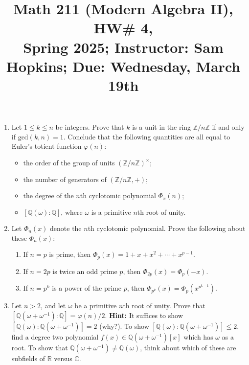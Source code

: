 \documentclass[11pt]{article}
\title{Math 211 (Modern Algebra II), HW\# 4, \\ {\normalsize Spring 2025; Instructor: Sam Hopkins; Due: Wednesday, March 19th}}
\date{}
\begin{document}
\maketitle

\thispagestyle{empty}

\begin{enumerate}

\item Let $1 \leq k \leq n$ be integers. Prove that $k$ is a unit in the ring $\mathbb{Z}/n\mathbb{Z}$ if and only if $\mathrm{gcd}(k,n)=1$. Conclude that the following quantities are all equal to Euler's totient function $\varphi(n)$:
\begin{itemize}
\item the order of the group of units $(\mathbb{Z}/n\mathbb{Z})^{\times}$;
\item the number of generators of $(\mathbb{Z}/n\mathbb{Z},+)$;
\item the degree of the $n$th cyclotomic polynomial $\Phi_x(n)$;
\item $[\mathbb{Q}(\omega)\colon\mathbb{Q}]$, where $\omega$ is a primitive $n$th root of unity.
\end{itemize}

\item Let $\Phi_n(x)$ denote the $n$th cyclotomic polynomial. Prove the following about these $\Phi_n(x)$:
\begin{enumerate}
\item If $n=p$ is prime, then $\Phi_p(x) = 1+x+x^2+\cdots+x^{p-1}$.
\item If $n=2p$ is twice an odd prime $p$, then $\Phi_{2p}(x) = \Phi_p(-x)$.
\item If $n=p^k$ is a power of the prime $p$, then $\Phi_{p^k}(x) = \Phi_{p}(x^{p^{k-1}})$.
\end{enumerate}

\item Let $n > 2$, and let $\omega$ be a primitive $n$th root of unity. Prove that $[\mathbb{Q}(\omega+\omega^{-1}):\mathbb{Q}] = \varphi(n)/2$. {\bf Hint:} It suffices to show $[\mathbb{Q}(\omega):\mathbb{Q}(\omega+\omega^{-1})]=2$ (why?). To show $[\mathbb{Q}(\omega):\mathbb{Q}(\omega+\omega^{-1})] \leq 2$, find a degree two polynomial $f(x) \in \mathbb{Q}(\omega+\omega^{-1})[x]$ which has $\omega$ as a root. To show that $\mathbb{Q}(\omega+\omega^{-1}) \neq \mathbb{Q}(\omega)$, think about which of these are subfields of $\mathbb{R}$ versus $\mathbb{C}$.


\end{enumerate}
\end{document}
